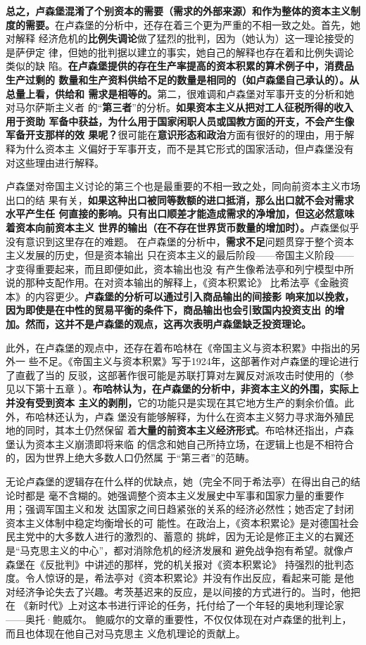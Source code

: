 \textbf{总之，卢森堡混淆了个别资本的需要（需求的外部来源）和作为整体的资本主义制
  度的需要。}在卢森堡的分析中，还存在着三个更为严重的不相一致之处。首先，她对解释
经济危机的\textbf{比例失调论}做了猛烈的批判，因为（她认为）这一理论接受的是萨伊定
律，但她的批判据以建立的事实，她自己的解释也存在着和比例失调论类似的缺
陷。\textbf{在卢森堡提供的存在生产率提高的资本积累的算术例子中，消费品生产过剩的
  数量和生产资料供给不足的数量是相同的（如卢森堡自己承认的）。从总量上看，供给和
  需求是相等的。}第二，很难调和卢森堡对军事开支的分析和她对马尔萨斯主义者
的“\textbf{第三者}”的分析。\textbf{如果资本主义从把对工人征税所得的收入用于资助
  军备中获益，为什么用于国家闲职人员或国教方面的开支，不会产生像军备开支那样的效
  果呢？}很可能在\textbf{意识形态和政治}方面有很好的的理由，用于解释为什么资本主
义偏好于军事开支，而不是其它形式的国家活动，但卢森堡没有对这些理由进行解释。

卢森堡对帝国主义讨论的第三个也是最重要的不相一致之处，同向前资本主义市场出口的结
果有关，\textbf{如果这种出口被同等数额的进口抵消，那么出口就不会对需求水平产生任
  何直接的影响。只有出口顺差才能造成需求的净增加，但这必然意味着资本向前资本主义
  世界的输出（在不存在世界货币数量的增加时）。}卢森堡似乎没有意识到这里存在的难题。
在卢森堡的分析中，\textbf{需求不足}问题贯穿于整个资本主义发展的历史，但是资本输出
只在资本主义的最后阶段——帝国主义阶段——才变得重要起来，而且即便如此，资本输出也没
有产生像希法亭和列宁模型中所说的那种支配作用。在对资本输出的解释上，《资本积累论》
比希法亭《金融资本》的内容更少。\textbf{卢森堡的分析可以通过引入商品输出的间接影
  响来加以挽救，因为即使是在中性的贸易平衡的条件下，商品输出也会引致国内投资支出
  的增加。然而，这并不是卢森堡的观点，这再次表明卢森堡缺乏投资理论。}

此外，在卢森堡的观点中，还存在着布哈林在《帝国主义与资本积累》中指出的另外一
些不足。《帝国主义与资本积累》写于1924年，这部著作对卢森堡的理论进行了直截了当的
反驳，这部著作很可能是苏联打算对左翼反对派攻击时使用的（参见以下第十五章
）。\textbf{布哈林认为，在卢森堡的分析中，非资本主义的外围，实际上并没有受到资本
  主义的剥削，}它的功能只是实现在其它地方生产的剩余价值。此外，布哈林还认为，卢森
堡没有能够解释，为什么在资本主义努力寻求海外殖民地的同时，其本土仍然保留
着\textbf{大量的前资本主义经济形式}。布哈林还指出，卢森堡认为资本主义崩溃即将来临
的信念和她自己所持立场，在逻辑上也是不相符合的，因为世界上绝大多数人口仍然属
于“第三者”的范畴。

无论卢森堡的逻辑存在什么样的优缺点，她（完全不同于希法亭）在得出自己的结论时都是
毫不含糊的。她强调整个资本主义发展史中军事和国家力量的重要作用；强调军国主义和发
达国家之间日趋紧张的关系的经济必然性；她否定了封闭资本主义体制中稳定均衡增长的可
能性。在政治上，《资本积累论》是对德国社会民主党中的大多数人进行的激烈的、蓄意的
挑衅，因为无论是修正主义的右翼还是“马克思主义的中心”，都对消除危机的经济发展和
避免战争抱有希望。就像卢森堡在《反批判》中讲述的那样，党的机关报对《资本积累论》
持强烈的批判态度。令人惊讶的是，希法亭对《资本积累论》并没有作出反应，看起来可能
是他对经济争论失去了兴趣。考茨基迟来的反应，是以间接的方式进行的。当时，他把在
《新时代》上对这本书进行评论的任务，托付给了一个年轻的奥地利理论家——奥托·鲍威尔。
鲍威尔的文章的重要性，不仅仅体现在对卢森堡的批判上，而且也体现在他自己对马克思主
义危机理论的贡献上。
\vfill

